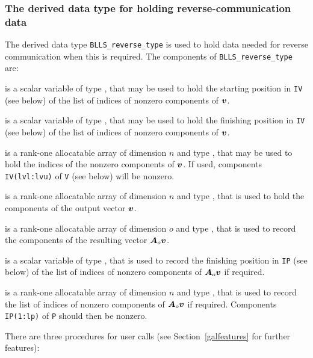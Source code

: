 \documentclass{galahad}
\newcommand{\packagename}{BLLS}
\begin{document}




\subsubsection{The derived data type for holding reverse-communication data}\label{typereverse}
The derived data type
{\tt \packagename\_reverse\_type}
is used to hold data needed for reverse communication when this is
required.
The components of
{\tt \packagename\_reverse\_type}
are:

\begin{description}

 is a scalar variable of type \integer, that
may be used to hold the starting position in {\tt IV} (see below)
of the list of indices of nonzero components of ${\bm{v}}$.

 is a scalar variable of type \integer, that
may be used to hold the finishing position in {\tt IV} (see below)
of the list of indices of nonzero components of ${\bm{v}}$.

 is a rank-one allocatable array of dimension $n$
and type \integer, that may be used to hold the indices of the
nonzero components of ${\bm{v}}$. If used, components
{\tt IV(lvl:lvu)} of {\tt V} (see below) will be nonzero.

 is a rank-one allocatable array of dimension $n$
and type \realdp, that is used to hold the components of the
output vector ${\bm{v}}$.

 is a rank-one allocatable array of dimension $o$
and type \realdp, that is used to record the components of the
resulting vector ${\bm{A}}_o {\bm{v}}$.

 is a scalar variable of type \integer, that
is used to record the finishing position in {\tt IP} (see below)
of the list of indices of nonzero components of ${\bm{A}}_o {\bm{v}}$ if required.

 is a rank-one allocatable array of dimension $n$
and type \integer, that is used to record the list of
indices of nonzero components of ${\bm{A}}_o {\bm{v}}$ if required. Components
{\tt IP(1:lp)} of {\tt P} should then be nonzero.

\end{description}


\galarguments
There are three procedures for user calls
(see Section~\ref{galfeatures} for further features):
\end{document}
